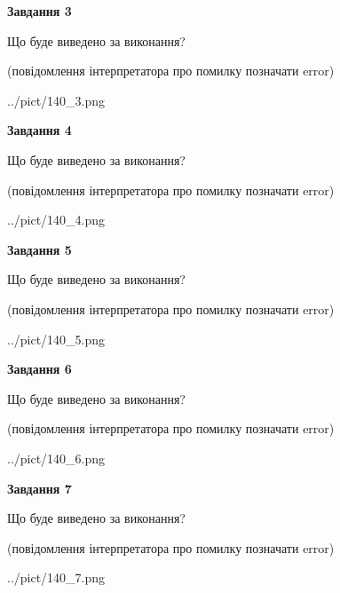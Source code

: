 \documentclass[12pt, ukrainian]{article}
\begin{document}
{\begin {large}
{\begin {center}\textbf{Завдання 3}\end {center}}\par
Що буде виведено за виконання?\par
 (повідомлення інтерпретатора про помилку позначати error)\par
\begin{center}
	{../pict/140_3.png}
\end{center}
\newpage

{\begin {center}\textbf{Завдання 4}\end {center}}\par
Що буде виведено за виконання?\par
 (повідомлення інтерпретатора про помилку позначати error)\par
\begin{center}
	{../pict/140_4.png}
\end{center}
\newpage

{\begin {center}\textbf{Завдання 5}\end {center}}\par
Що буде виведено за виконання?\par
 (повідомлення інтерпретатора про помилку позначати error)\par
\begin{center}
	{../pict/140_5.png}
\end{center}
\newpage

{\begin {center}\textbf{Завдання 6}\end {center}}\par
Що буде виведено за виконання?\par
 (повідомлення інтерпретатора про помилку позначати error)\par
\begin{center}
	{../pict/140_6.png}
\end{center}
\newpage

{\begin {center}\textbf{Завдання 7}\end {center}}\par
Що буде виведено за виконання?\par
 (повідомлення інтерпретатора про помилку позначати error)\par
\begin{center}
	{../pict/140_7.png}
\end{center}
\newpage


\end{large}}
\end{document}
